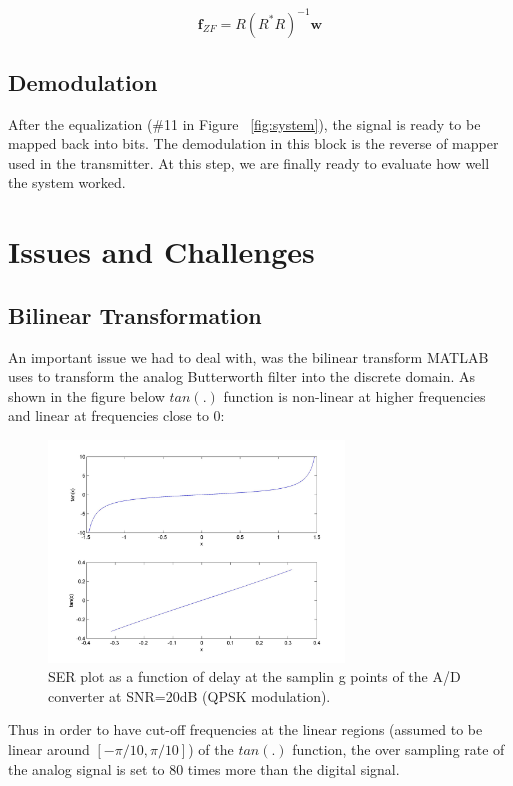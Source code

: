 \documentclass[]{article}
\begin{document}
\begin{equation}
\label{eq:zf} 
\mathbf{f}_{ZF} = R \left(R^{\ast}R \right)^{-1} \mathbf{w}
\end{equation}

\subsection{Demodulation}
\label{sec:demod}
After the equalization (\#11 in Figure ~\ref{fig:system}), the signal is ready to be mapped back into bits.  The demodulation in this block is the reverse of mapper used in the transmitter.  At this step, we are finally ready to evaluate how well the system worked.

\newpage

\section{Issues and Challenges}
\label{sec:issues}

\subsection{Bilinear Transformation}
An important issue we had to deal with, was the bilinear transform MATLAB uses to transform the analog Butterworth filter into the discrete domain. As shown in the figure below $tan(.)$ function is non-linear at higher frequencies and linear at frequencies close to 0:

\begin{figure}[H]
\centering
\includegraphics[width=0.7\textwidth]{tan_graph.jpg}
\caption{SER plot as a function of delay at the samplin g points of the A/D converter at SNR=20dB (QPSK modulation). \label{fig:delay}}
\end{figure} 

Thus in order to have cut-off frequencies at the linear regions (assumed to be linear around $\left[ -\pi/10,\pi/10 \right] $) of the $tan(.)$ function, the over sampling rate of the analog signal is set to 80 times more than the digital signal. \\
\end{document}
